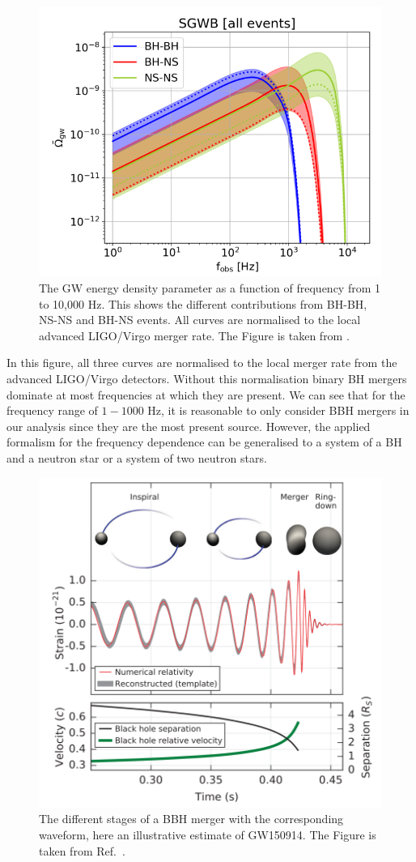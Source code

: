 \begin{figure}[h]
    \centering
    \includegraphics[width=0.7\linewidth]{Images/Capurri_GW_Background_monopole_sources.png}
    \caption[The GW energy density parameter as a function of frequency from 1 to 10,000 Hz.]{The GW energy density parameter as a function of frequency from 1 to 10,000 Hz. This shows the different contributions from BH-BH, NS-NS and BH-NS events. All curves are normalised to the local advanced LIGO/Virgo merger rate. The Figure is taken from \cite{capurri_intensity_2021}.} 
    \label{BG_sources}
\end{figure} 

In this figure, all three curves are normalised to the local merger rate from the advanced LIGO/Virgo detectors. Without this normalisation binary BH mergers dominate at most frequencies at which they are present. We can see that for the frequency range of $1-1000$ Hz, it is reasonable to only consider BBH mergers in our analysis since they are the most present source. However, the applied formalism for the frequency dependence can be generalised to a system of a BH and a neutron star or a system of two neutron stars.

\begin{figure}[h]
    \centering
    \includegraphics[width=0.7\linewidth]{Images/waveform_abbott_complete.png}
    \caption[The different stages of a BBH merger with the corresponding waveform.]{The different stages of a BBH merger with the corresponding waveform, here an illustrative estimate of GW150914. The Figure is taken from Ref.\ \cite{abbott_observation_2016}.}
    \label{GW_waveform}
\end{figure} 

